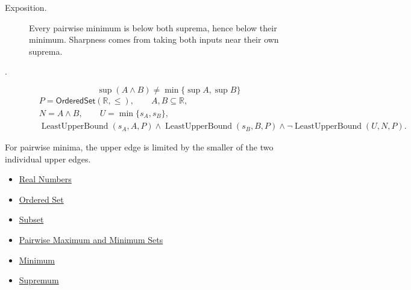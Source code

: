 \begin{remark*}
\begin{description}
\item[Exposition.]
Every pairwise minimum is below both suprema, hence below their minimum.
Sharpness comes from taking both inputs near their own suprema.


  \item[.]
  \[
\sup(A\wedge B)\neq\min\{\sup A,\sup B\}
\]
\[
\begin{aligned}
&P=\mathsf{OrderedSet}(\mathbb{R},\leq),\qquad A,B\subseteq\mathbb{R},\\
&N=A\wedge B,\qquad U=\min\{s_A,s_B\},\\
&\operatorname{LeastUpperBound}(s_A,A,P)\land\operatorname{LeastUpperBound}(s_B,B,P)\land
\neg\operatorname{LeastUpperBound}(U,N,P).
\end{aligned}
\]
\end{description}
\end{remark*}

\begin{remark*}[Interpretation]
For pairwise minima, the upper edge is limited by the smaller of the two
individual upper edges.
\end{remark*}

\begin{dependencies}
\begin{itemize}
  \item \hyperref[def:reals]{Real Numbers}
  \item \hyperref[def:ordered-set]{Ordered Set}
  \item \hyperref[def:subset]{Subset}
  \item \hyperref[def:pairwise-maximum-minimum-sets]{Pairwise Maximum and Minimum Sets}
  \item \hyperref[def:minimum]{Minimum}
  \item \hyperref[def:supremum]{Supremum}
\end{itemize}
\end{dependencies}

